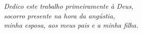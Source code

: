 \begin{dedicatoria}
   \vspace*{\fill}
   \begin{flushright}
   
   \textit{Dedico este trabalho primeiramente à Deus,
   \\ socorro presente na hora da angústia,
    \\minha esposa, aos meus pais e a minha filha.}
  
   \end{flushright}
\end{dedicatoria}


